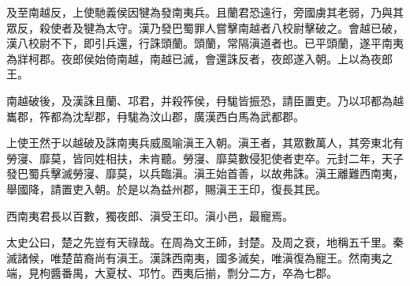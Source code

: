 及至南越反，上使馳義侯因犍為發南夷兵。且蘭君恐遠行，旁國虜其老弱，乃與其眾反，殺使者及犍為太守。漢乃發巴蜀罪人嘗擊南越者八校尉擊破之。會越已破，漢八校尉不下，即引兵還，行誅頭蘭。頭蘭，常隔滇道者也。已平頭蘭，遂平南夷為牂柯郡。夜郎侯始倚南越，南越已滅，會還誅反者，夜郎遂入朝。上以為夜郎王。

南越破後，及漢誅且蘭、邛君，并殺筰侯，冄駹皆振恐，請臣置吏。乃以邛都為越巂郡，筰都為沈犁郡，冄駹為汶山郡，廣漢西白馬為武都郡。

上使王然于以越破及誅南夷兵威風喻滇王入朝。滇王者，其眾數萬人，其旁東北有勞寖、靡莫，皆同姓相扶，未肯聽。勞寖、靡莫數侵犯使者吏卒。元封二年，天子發巴蜀兵擊滅勞寖、靡莫，以兵臨滇。滇王始首善，以故弗誅。滇王離難西南夷，舉國降，請置吏入朝。於是以為益州郡，賜滇王王印，復長其民。

西南夷君長以百數，獨夜郎、滇受王印。滇小邑，最寵焉。

太史公曰，楚之先豈有天祿哉。在周為文王師，封楚。及周之衰，地稱五千里。秦滅諸候，唯楚苗裔尚有滇王。漢誅西南夷，國多滅矣，唯滇復為寵王。然南夷之端，見枸醬番禺，大夏杖、邛竹。西夷后揃，剽分二方，卒為七郡。
